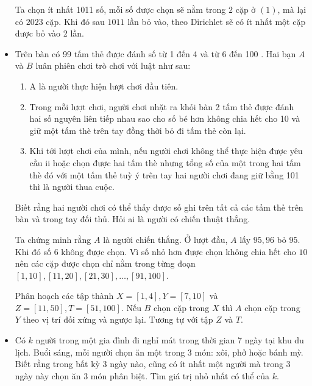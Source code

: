 \documentclass[11pt]{scrartcl}
\begin{document}
\begin{itemize}[label=, leftmargin=0em, itemsep=0.5em]
\begin{sol}
             Ta chọn ít nhất 1011 số, mỗi số được chọn sẽ nằm trong $2$ cặp ở $(1)$, mà lại có $2023$ cặp. Khi đó sau $1011$ lần bỏ vào, theo Dirichlet sẽ có ít nhất một cặp được bỏ vào 2 lần. 
        \end{sol}
    \item \begin{bt}
        Trên bàn có 99 tấm thẻ được đánh số từ 1 đến 4 và từ 6 đến 100 . Hai bạn $A$ và $B$ luân phiên chơi trò chơi với luật như sau:
        \begin{enumerate}
            \item A là người thực hiện lượt chơi đầu tiên.
            \item Trong mỗi lượt chơi, người chơi nhặt ra khỏi bàn 2 tấm thẻ được đánh hai số nguyên liên tiếp nhau sao cho số bé hơn không chia hết cho 10 và giữ một tấm thè trên tay đồng thời bỏ đi tấm thẻ còn lại.
            \item Khi tới lượt chơi của mình, nếu người chơi không thể thực hiện được yêu cầu ii hoặc chọn được hai tấm thè nhưng tổng số của một trong hai tấm thè đó với một tấm thẻ tuỳ ý trên tay hai người chơi đang giữ bằng 101 thì là người thua cuộc.
        \end{enumerate}
        Biết rằng hai người chơi có thể thấy được số ghi trên tất cả các tấm thẻ trên bàn và trong tay đối thủ. Hỏi ai là người có chiến thuật thắng.
    \end{bt}
    \begin{sol}
        Ta chứng minh rằng $A$ là người chiến thắng. Ở lượt đầu, $A$ lấy $95,96$ bỏ $95$. Khi đó số $6$ không được chọn. Vì số nhỏ hơn được chọn không chia hết cho $10$ nên các cặp được chọn chỉ nằm trong từng đoạn $[1,10],[11,20],[21,30],\dots,[91,100]$. 
        
        Phân hoạch các tập thành $X = [1,4],Y = [7,10]$ và $Z = [11,50],T= [51,100]$. Nếu $B$ chọn cặp trong $X$ thì $A$ chọn cặp trong $Y$ theo vị trí đối xứng và ngược lại. Tương tự với tập $Z$ và $T$.
    \end{sol}
    

    \item \begin{btvn} Có $k$ người trong một gia đình đi nghỉ mát trong thời gian 7 ngày tại khu du lịch. Buổi sáng, mỗi người chọn ăn một trong 3 món: xôi, phở hoặc bánh mỳ. Biết rằng trong bất kỳ 3 ngày nào, cũng có ít nhất một người mà trong 3 ngày này chọn ăn 3 món phân biệt. Tìm giá trị nhỏ nhất có thể của $k$.
        

\end{btvn}
\end{itemize}
\end{document}
